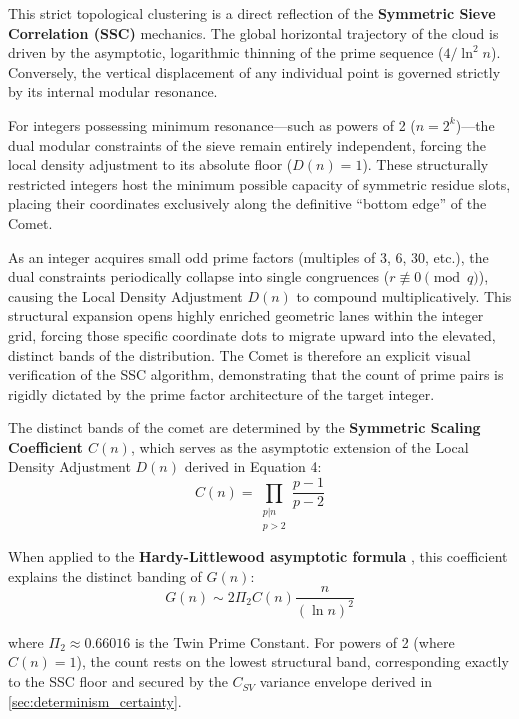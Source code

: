 \documentclass[sn-mathphys-num, pdflatex]{sn-jnl}
\begin{document}
This strict topological clustering is a direct reflection of the \textbf{Symmetric Sieve Correlation (SSC)} mechanics. The global horizontal trajectory of the cloud is driven by the asymptotic, logarithmic thinning of the prime sequence ($4/\ln^2 n$). Conversely, the vertical displacement of any individual point is governed strictly by its internal modular resonance. 

For integers possessing minimum resonance—such as powers of 2 ($n = 2^k$)—the dual modular constraints of the sieve remain entirely independent, forcing the local density adjustment to its absolute floor ($D(n) = 1$). These structurally restricted integers host the minimum possible capacity of symmetric residue slots, placing their coordinates exclusively along the definitive ``bottom edge'' of the Comet. 

As an integer acquires small odd prime factors (multiples of 3, 6, 30, etc.), the dual constraints periodically collapse into single congruences ($r \not\equiv 0 \pmod{q}$), causing the Local Density Adjustment $D(n)$ to compound multiplicatively. This structural expansion opens highly enriched geometric lanes within the integer grid, forcing those specific coordinate dots to migrate upward into the elevated, distinct bands of the distribution. The Comet is therefore an explicit visual verification of the SSC algorithm, demonstrating that the count of prime pairs is rigidly dictated by the prime factor architecture of the target integer.

The distinct bands of the comet are determined by the \textbf{Symmetric Scaling Coefficient $C(n)$}, which serves as the asymptotic extension of the Local Density Adjustment $D(n)$ derived in Equation 4:
\begin{equation}
\label{eq:scaling_coefficient}
C(n) = \prod_{\substack{p|n \\ p>2}} \frac{p-1}{p-2}
\end{equation}

When applied to the \textbf{Hardy-Littlewood asymptotic formula} \cite{hardy1923}, this coefficient explains the distinct banding of $G(n)$:
\begin{equation}
\label{eq:hardy_littlewood}
G(n) \sim 2 \Pi_2 C(n) \frac{n}{(\ln n)^2}
\end{equation}

where $\Pi_2 \approx 0.66016$ is the Twin Prime Constant. For powers of 2 (where $C(n)=1$), the count rests on the lowest structural band, corresponding exactly to the SSC floor and secured by the $C_{SV}$ variance envelope derived in \ref{sec:determinism_certainty}.
\end{document}
